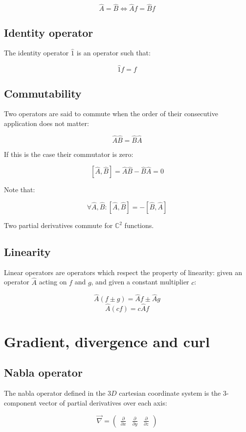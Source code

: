 	$$\hat{A} = \hat{B} \Leftrightarrow \hat{A}f = \hat{B}f$$

	\subsection{Identity operator}
	The identity operator $\hat{1}$ is an operator such that:

	$$\hat{1}f = f$$

	\subsection{Commutability}
	Two operators are said to commute when the order of their consecutive application does not matter:

	$$\hat{A}\hat{B} = \hat{B}\hat{A}$$

	If this is the case their commutator is zero:

	$$[\hat{A}, \hat{B}] = \hat{A}\hat{B}-\hat{B}\hat{A} = 0$$

	Note that:

	$$\forall \hat{A}, \hat{B}: [\hat{A}, \hat{B}] = -[\hat{B}, \hat{A}]$$

	Two partial derivatives commute for $\mathbb{C}^2$ functions.

	\subsection{Linearity}
	Linear operators are operators which respect the property of linearity: given an operator $\hat{A}$ acting on $f$ and $g$, and given a constant multiplier $c$:

	$$\hat{A}(f\pm g) = \hat{A}f\pm \hat{A}g$$
	$$\hat{A}(cf) = c\hat{A}f$$

\section{Gradient, divergence and curl}

	\subsection{Nabla operator}
	The nabla operator defined in the $3D$ cartesian coordinate system is the $3$-component vector of partial derivatives over each axis:

	$$\vec{\nabla} = \begin{pmatrix} \frac{\partial}{\partial x} & \frac{\partial}{\partial y} & \frac{\partial}{\partial z}\end{pmatrix}$$


